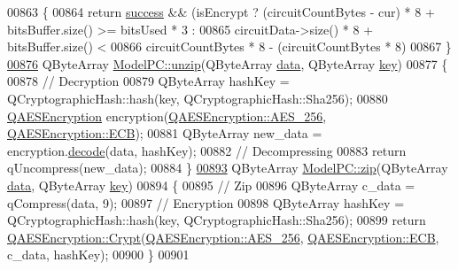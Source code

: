 \begin{DoxyCode}
{00863 \{
00864     \textcolor{keywordflow}{return} \hyperlink{class_model_p_c_a945ffbbc44a832b953c191debd448f4c}{success} && (isEncrypt ? (circuitCountBytes - cur) * 8 + bitsBuffer.size() >= bitsUsed * 3
       :
00865                                    circuitData->size() * 8 + bitsBuffer.size() <
00866                                    circuitCountBytes * 8 - (circuitCountBytes * 8)%
00867 \}
\hypertarget{modelpc_8cpp_source.tex_l00876}{}\hyperlink{class_model_p_c_a6da88f166785a49f73b22c169f956fd0}{00876} QByteArray \hyperlink{class_model_p_c_a6da88f166785a49f73b22c169f956fd0}{ModelPC::unzip}(QByteArray \hyperlink{namespace_errors_dict_setup_af570460846fb9f0c91abd308a095dcdc}{data}, QByteArray \hyperlink{namespace_errors_dict_setup_a09c268098d09ffb8e5504f30fa6d5dd9}{key})
00877 \{
00878     \textcolor{comment}{// Decryption}
00879     QByteArray hashKey = QCryptographicHash::hash(key, QCryptographicHash::Sha256);
00880     \hyperlink{class_q_a_e_s_encryption}{QAESEncryption} encryption(\hyperlink{class_q_a_e_s_encryption_abe48208f4f6c7d68e6a10b49b9d0b7bdacde97774ab1d4c609e04b0dd13a1e1f7}{QAESEncryption::AES\_256}, 
      \hyperlink{class_q_a_e_s_encryption_ad3e031c49a3d56566379d75b40b7b255a4ca7f51778e2adf1f464164a0ba8e75e}{QAESEncryption::ECB});
00881     QByteArray new\_data = encryption.\hyperlink{class_q_a_e_s_encryption_a58f972f2b66c2454edd5112495463bba}{decode}(data, hashKey);
00882     \textcolor{comment}{// Decompressing}
00883     \textcolor{keywordflow}{return} qUncompress(new\_data);
00884 \}
\hypertarget{modelpc_8cpp_source.tex_l00893}{}\hyperlink{class_model_p_c_afebbbfa4b07deba4f68fc6dfb50f353f}{00893} QByteArray \hyperlink{class_model_p_c_afebbbfa4b07deba4f68fc6dfb50f353f}{ModelPC::zip}(QByteArray \hyperlink{namespace_errors_dict_setup_af570460846fb9f0c91abd308a095dcdc}{data}, QByteArray \hyperlink{namespace_errors_dict_setup_a09c268098d09ffb8e5504f30fa6d5dd9}{key})
00894 \{
00895     \textcolor{comment}{// Zip}
00896     QByteArray c\_data = qCompress(data, 9);
00897     \textcolor{comment}{// Encryption}
00898     QByteArray hashKey = QCryptographicHash::hash(key, QCryptographicHash::Sha256);
00899     \textcolor{keywordflow}{return} \hyperlink{class_q_a_e_s_encryption_a43819eeb6a7cb29fbd3cb6ad640dcbdf}{QAESEncryption::Crypt}(\hyperlink{class_q_a_e_s_encryption_abe48208f4f6c7d68e6a10b49b9d0b7bdacde97774ab1d4c609e04b0dd13a1e1f7}{QAESEncryption::AES\_256}, 
      \hyperlink{class_q_a_e_s_encryption_ad3e031c49a3d56566379d75b40b7b255a4ca7f51778e2adf1f464164a0ba8e75e}{QAESEncryption::ECB}, c\_data, hashKey);
00900 \}
00901 
}
\end{DoxyCode}
